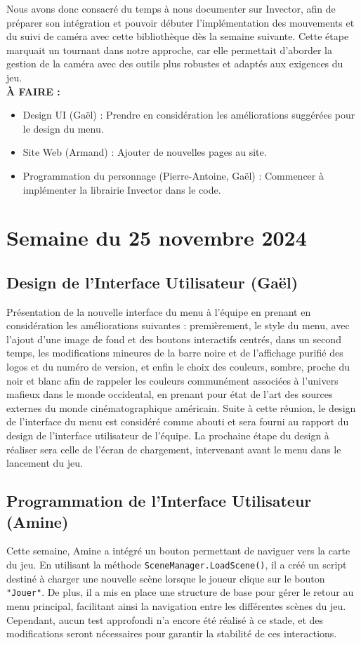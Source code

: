\documentclass{report}
\begin{document}
Nous avons donc consacré du temps à nous documenter sur Invector, afin de préparer son intégration et pouvoir débuter l’implémentation des mouvements et du suivi de caméra avec cette bibliothèque dès la semaine suivante. Cette étape marquait un tournant dans notre approche, car elle permettait d’aborder la gestion de la caméra avec des outils plus robustes et adaptés aux exigences du jeu.
\\[1cm]
\textbf{À FAIRE :}
\begin{itemize}
    \item Design UI (Gaël) : Prendre en considération les améliorations suggérées pour le design du menu.
    \item Site Web (Armand) : Ajouter de nouvelles pages au site.
    \item Programmation du personnage (Pierre-Antoine, Gaël) : Commencer à implémenter la librairie Invector dans le code.
\end{itemize}

\newpage
\section{Semaine du 25 novembre 2024}

\subsection*{Design de l'Interface Utilisateur (Gaël)}
Présentation de la nouvelle interface du menu à l'équipe en prenant en considération les améliorations suivantes : premièrement, le style du menu, avec l'ajout d'une image de fond et des boutons interactifs centrés, dans un second temps, les modifications mineures de la barre noire et de l'affichage purifié des logos et du numéro de version, et enfin le choix des couleurs, sombre, proche du noir et blanc afin de rappeler les couleurs communément associées à l'univers mafieux dans le monde occidental, en prenant pour état de l'art des sources externes du monde cinématographique américain. Suite à cette réunion, le design de l'interface du menu est considéré comme abouti et sera fourni au rapport du design de l'interface utilisateur de l'équipe. La prochaine étape du design à réaliser sera celle de l'écran de chargement, intervenant avant le menu dans le lancement du jeu.

\subsection*{Programmation de l'Interface Utilisateur (Amine)}
Cette semaine, Amine a intégré un bouton permettant de naviguer vers la carte du jeu. En utilisant la méthode \texttt{SceneManager.LoadScene()}, il a créé un script destiné à charger une nouvelle scène lorsque le joueur clique sur le bouton \texttt{"Jouer"}. De plus, il a mis en place une structure de base pour gérer le retour au menu principal, facilitant ainsi la navigation entre les différentes scènes du jeu. Cependant, aucun test approfondi n’a encore été réalisé à ce stade, et des modifications seront nécessaires pour garantir la stabilité de ces interactions.
\end{document}

